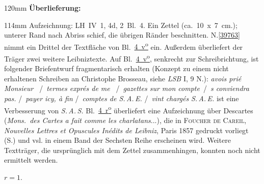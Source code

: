 \begin{ledgroupsized}[r]{120mm}
\footnotesize
\pstart
\noindent\textbf{Überlieferung:}
\pend
\end{ledgroupsized}
\begin{ledgroupsized}[r]{114mm}
\footnotesize
\pstart \parindent -6mm
%
Aufzeichnung:
LH~IV~1, 4d, 2~Bl.~4. 
Ein Zettel (ca.~10~x~7~cm.);
unterer Rand nach Abriss schief, die übrigen Ränder beschnitten.
N.\;\ref{39763} nimmt ein Drittel der Textfläche von 
Bl.~\href{\Scan{LH_04_01_04d_02_004v}}%
{4~v\textsuperscript{o}}
ein.
Außerdem überliefert der Träger zwei weitere Leibniztexte.
Auf Bl.~\href{\Scan{LH_04_01_04d_02_004v}}%
{4~v\textsuperscript{o}},
senkrecht zur Schreibrichtung, ist folgender Briefentwurf %
fragmentarisch erhalten (Konzept zu einem nicht erhaltenen Schreiben an
Christophe Brosseau, siehe \cite{02148}\textit{LSB} I, 9 N.):
\textlangle\textendash\textrangle\textit{avois prié Monsi}\textlangle\textit{eur}\textrangle\ %
\lbrack/\rbrack\
\textlangle \textit{ter}\textrangle\textit{mes exprés de me}\textlangle\textendash\textrangle\ %
\lbrack/\rbrack\
\textlangle\textit{ga}\textrangle\textit{zettes sur mon comp}\textlangle\textit{te}\textrangle\
\lbrack/\rbrack\
\textlangle\textendash\textrangle\textit{s conviendra pas.}
\lbrack/\rbrack\
\textit{payer icy, à fin}
\lbrack/\rbrack\
\textit{comptes de S.\,A.\,E.}
\lbrack/\rbrack\
\textlangle\textendash\textrangle\textit{vint chargés}
\bracks{\textit{Text bricht ab.}} %
\textit{S.\,A.\,E.} ist eine Verbesserung von \textit{S.\,A.\,S.}
Bl.~\href{\Scan{LH_04_01_04d_02_004r}}%
{4~r\textsuperscript{o}}
überliefert eine Aufzeichnung über Descartes %
(\textit{Mons.~des Cartes a fait comme les charlatans}...), die in 
\cite{02150}\textsc{Foucher de Careil}, \textit{Nouvelles Lettres et Opuscules Inédits de Leibniz}, Paris 1857 
gedruckt vorliegt (S.\;12) und vsl. in einem Band der Sechsten Reihe erscheinen wird.
Weitere Textträger, die ursprünglich mit dem Zettel zusammenhingen, konnten noch nicht ermittelt werden. %
\pend
\end{ledgroupsized}
\selectlanguage{latin}
\vspace{8mm}
\pstart%
\normalsize%
\noindent
{}%
$r=1$.
